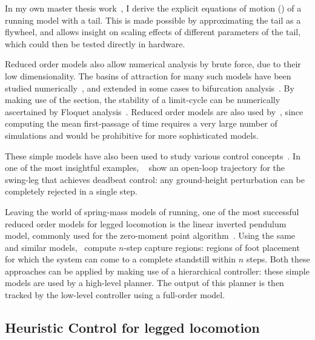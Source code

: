 In my own master thesis work~\cite{heim2016designing}, I derive the explicit equations of motion (\eom) of a running model with a tail. This is made possible by approximating the tail as a flywheel, and allows insight on scaling effects of different parameters of the tail, which could then be tested directly in hardware. \par
Reduced order models also allow numerical analysis by brute force, due to their low dimensionality. The basins of attraction for many such models have been studied numerically~\cite{schwab2001basin,obayashi2016formation,cnops2015basin,rummel2008stable}, and extended in some cases to bifurcation analysis~\cite{aoi2006bifurcation,merker2015stable,gan2018all}. By making use of the \poincare section, the stability of a limit-cycle can be numerically ascertained by Floquet analysis~\cite{remy2011matlab}.
Reduced order models are also used by~\textcite{byl2009metastable}, since computing the mean first-passage of time requires a very large number of simulations and would be prohibitive for more sophisticated models. \par
These simple models have also been used to study various control concepts~\cite{piovan2013two,cnops2015basin,piovan2015reachability}. In one of the most insightful examples, ~\textcite{wu20133} show an open-loop trajectory for the swing-leg that achieves deadbeat control: any ground-height perturbation can be completely rejected in a single step. \par 
Leaving the world of spring-mass models of running, one of the most successful reduced order models for legged locomotion is the linear inverted pendulum model, commonly used for the zero-moment point algorithm~\cite{kajita2001LIP,kajita2003ZMP}. Using the same and similar models,~\textcite{koolen2012capturability} compute $n$-step capture regions: regions of foot placement for which the system can come to a complete standstill within $n$ steps. Both these approaches can be applied by making use of a hierarchical controller: these simple models are used by a high-level planner. The output of this planner is then tracked by the low-level controller using a full-order model.

\subsection{Heuristic Control for legged locomotion}



